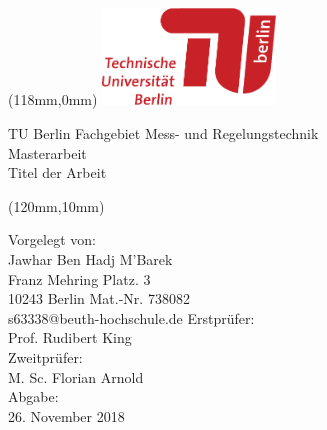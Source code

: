 \begin{titlepage}
	\begin{textblock*}{0mm}(118mm,0mm)
			\includegraphics[width=46mm]{Abbildungen/Deckblatt/TU_Logo_lang_4c_rot.pdf}  
	\end{textblock*} 

\vspace*{4cm}
    
    \begin{cmssb}
    	\begin{flushleft}
    		\vspace*{10pt} 
    		\textsf{\fontsize{14}{0}\selectfont TU Berlin Fachgebiet Mess- und Regelungstechnik}\\
			\vspace*{10pt} 
			\textsf{\fontsize{30}{0}\selectfont Masterarbeit}\\
			\vspace*{10pt}
			\textcolor{tured}{\textsf{\fontsize{14}{0}\selectfont Titel der Arbeit}}
		\end{flushleft}
	\end{cmssb}
 
\begin{textblock*}{60mm}(120mm,10mm)
    \begin{flushleft}
    	\begin{cmss}
    		\begin{normalsize}		
    			\textcolor{tugrey}{Vorgelegt von:}\\
				Jawhar Ben Hadj M'Barek\\
				Franz Mehring Platz. 3\\
				10243 Berlin \linebreak\linebreak
				Mat.-Nr. 738082\\
				s63338@beuth-hochschule.de
				\linebreak\linebreak\linebreak
				\textcolor{tugrey}{Erstprüfer:}\\
				Prof. Rudibert King\\
				\textcolor{tugrey}{Zweitprüfer:}\\
				M. Sc. Florian Arnold\\
				\textcolor{tugrey}{Abgabe:}\\
				26. November 2018\linebreak\linebreak
			\end{normalsize}	
		\end{cmss}
    \end{flushleft}    
\end{textblock*} 	

\end{titlepage}

\newpage

\thispagestyle{empty}
